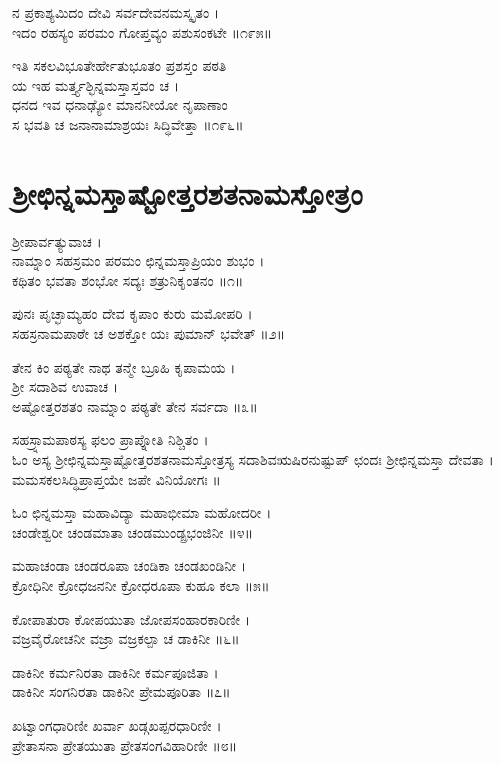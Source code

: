 ನ ಪ್ರಕಾಶ್ಯಮಿದಂ ದೇವಿ ಸರ್ವದೇವನಮಸ್ಕೃತಂ ।\\
ಇದಂ ರಹಸ್ಯಂ ಪರಮಂ ಗೋಪ್ತವ್ಯಂ ಪಶುಸಂಕಟೇ ॥೧೯೫॥

ಇತಿ ಸಕಲವಿಭೂತೇರ್ಹೇತುಭೂತಂ ಪ್ರಶಸ್ತಂ ಪಠತಿ\\
ಯ ಇಹ ಮರ್ತ್ತ್ಯಶ್ಛಿನ್ನಮಸ್ತಾಸ್ತವಂ ಚ ।\\
ಧನದ ಇವ ಧನಾಢ್ಯೋ ಮಾನನೀಯೋ ನೃಪಾಣಾಂ\\
ಸ ಭವತಿ ಚ ಜನಾನಾಮಾಶ್ರಯಃ ಸಿದ್ಧಿವೇತ್ತಾ ॥೧೯೬॥



\section{ಶ್ರೀಛಿನ್ನಮಸ್ತಾಷ್ಟೋತ್ತರಶತನಾಮಸ್ತೋತ್ರಂ}


ಶ್ರೀಪಾರ್ವತ್ಯುವಾಚ ।\\
ನಾಮ್ನಾಂ ಸಹಸ್ರಮಂ ಪರಮಂ ಛಿನ್ನಮಸ್ತಾಪ್ರಿಯಂ ಶುಭಂ ।\\
ಕಥಿತಂ ಭವತಾ ಶಂಭೋ ಸದ್ಯಃ ಶತ್ರುನಿಕೃಂತನಂ ॥೧॥

ಪುನಃ ಪೃಚ್ಛಾಮ್ಯಹಂ ದೇವ ಕೃಪಾಂ ಕುರು ಮಮೋಪರಿ ।\\
ಸಹಸ್ರನಾಮಪಾಠೇ ಚ ಅಶಕ್ತೋ ಯಃ ಪುಮಾನ್ ಭವೇತ್ ॥೨॥

ತೇನ ಕಿಂ ಪಠ್ಯತೇ ನಾಥ ತನ್ಮೇ ಬ್ರೂಹಿ ಕೃಪಾಮಯ ।\\
ಶ್ರೀ ಸದಾಶಿವ ಉವಾಚ ।\\
ಅಷ್ಟೋತ್ತರಶತಂ ನಾಮ್ನಾಂ ಪಠ್ಯತೇ ತೇನ ಸರ್ವದಾ ॥೩॥

ಸಹಸ್ರ್ನಾಮಪಾಠಸ್ಯ ಫಲಂ ಪ್ರಾಪ್ನೋತಿ ನಿಶ್ಚಿತಂ ।\\
ಓಂ ಅಸ್ಯ ಶ್ರೀಛಿನ್ನಮಸ್ತಾಷ್ಟೋತ್ತರಶತನಾಮಸ್ತೋತ್ರಸ್ಯ ಸದಾಶಿವಋಷಿರನುಷ್ಟುಪ್ ಛಂದಃ ಶ್ರೀಛಿನ್ನಮಸ್ತಾ ದೇವತಾ । ಮಮಸಕಲಸಿದ್ಧಿಪ್ರಾಪ್ತಯೇ ಜಪೇ ವಿನಿಯೋಗಃ ॥

ಓಂ ಛಿನ್ನಮಸ್ತಾ ಮಹಾವಿದ್ಯಾ ಮಹಾಭೀಮಾ ಮಹೋದರೀ ।\\
ಚಂಡೇಶ್ವರೀ ಚಂಡಮಾತಾ ಚಂಡಮುಂಡ್ಪ್ರಭಂಜಿನೀ ॥೪॥

ಮಹಾಚಂಡಾ ಚಂಡರೂಪಾ ಚಂಡಿಕಾ ಚಂಡಖಂಡಿನೀ ।\\
ಕ್ರೋಧಿನೀ ಕ್ರೋಧಜನನೀ ಕ್ರೋಧರೂಪಾ ಕುಹೂ ಕಲಾ ॥೫॥

ಕೋಪಾತುರಾ ಕೋಪಯುತಾ ಜೋಪಸಂಹಾರಕಾರಿಣೀ ।\\
ವಜ್ರವೈರೋಚನೀ ವಜ್ರಾ ವಜ್ರಕಲ್ಪಾ ಚ ಡಾಕಿನೀ ॥೬॥

ಡಾಕಿನೀ ಕರ್ಮನಿರತಾ ಡಾಕಿನೀ ಕರ್ಮಪೂಜಿತಾ ।\\
ಡಾಕಿನೀ ಸಂಗನಿರತಾ ಡಾಕಿನೀ ಪ್ರೇಮಪೂರಿತಾ ॥೭॥

ಖಟ್ವಾಂಗಧಾರಿಣೀ ಖರ್ವಾ ಖಡ್ಗಖಪ್ಪರಧಾರಿಣೀ ।\\
ಪ್ರೇತಾಸನಾ ಪ್ರೇತಯುತಾ ಪ್ರೇತಸಂಗವಿಹಾರಿಣೀ ॥೮॥

